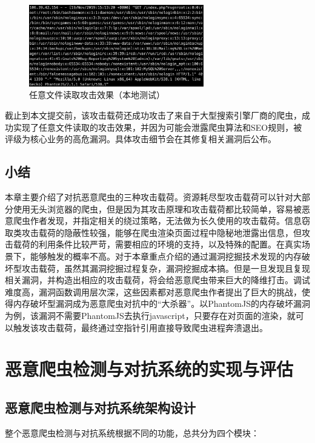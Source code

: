 \documentclass[doctor,privacy,twoside]{buaa_mac}
\begin{document}
\begin{figure}[!h]
  \centering
  \includegraphics[width=0.68\textwidth]{images/file_read.png}
  \caption{任意文件读取攻击效果（本地测试）}
  \label{fig:fileread}
\end{figure}


截止到本文提交前，该攻击载荷还成功攻击了来自于大型搜索引擎厂商的爬虫，成功实现了任意文件读取的攻击效果，并因为可能会泄露爬虫算法和SEO规则，被评级为核心业务的高危漏洞。具体攻击细节会在其修复相关漏洞后公布。

\section{小结}
本章主要介绍了对抗恶意爬虫的三种攻击载荷。资源耗尽型攻击载荷可以针对大部分使用无头浏览器的爬虫，但是因为其攻击原理和攻击载荷都比较简单，容易被恶意爬虫作者发现，并指定相关的绕过策略，无法做为长久使用的攻击载荷。信息窃取类攻击载荷的隐蔽性较强，能够在爬虫渲染页面过程中隐秘地泄露出信息，但攻击载荷的利用条件比较严苛，需要相应的环境的支持，以及特殊的配置。在真实场景下，能够触发的概率不高。对于本章重点介绍的通过漏洞挖掘技术发现的内存破坏型攻击载荷，虽然其漏洞挖掘过程复杂，漏洞挖掘成本搞。但是一旦发现且复现相关漏洞，并构造出相应的攻击载荷，将会给恶意爬虫带来巨大的降维打击。调试难度高，漏洞函数调用层次深，这些因素都对恶意爬虫作者提出了巨大的挑战，使得内存破坏型漏洞成为恶意爬虫对抗中的“大杀器”。以PhantomJS的内存破坏漏洞为例，该漏洞不需要PhantomJS去执行javascript，只要存在对页面的渲染，就可以触发该攻击载荷，最终通过空指针引用直接导致爬虫进程奔溃退出。


\chapter{恶意爬虫检测与对抗系统的实现与评估}



\section{恶意爬虫检测与对抗系统架构设计}

整个恶意爬虫检测与对抗系统根据不同的功能，总共分为四个模块：
\end{document}
